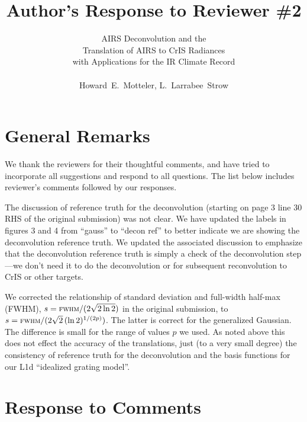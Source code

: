 \documentclass[11pt]{article}
\begin{document}
\title{Author's Response to Reviewer \#2 }

\author{AIRS Deconvolution and the \\
       Translation of AIRS to CrIS Radiances \\ 
       with Applications for the IR Climate Record \\
       \\
       Howard~E.~Motteler, L.~Larrabee~Strow}

\maketitle

\section{General Remarks}

We thank the reviewers for their thoughtful comments, and have tried
to incorporate all suggestions and respond to all questions.  The list
below includes reviewer's comments followed by our responses.

The discussion of reference truth for the deconvolution (starting on
page 3 line 30 RHS of the original submission) was not clear.  We
have updated the labels in figures 3 and 4 from ``gauss'' to ``decon
ref'' to better indicate we are showing the deconvolution reference
truth.  We updated the associated discussion to emphasize that the
deconvolution reference truth is simply a check of the deconvolution
step---we don't need it to do the deconvolution or for subsequent
reconvolution to CrIS or other targets.

We corrected the relationship of standard deviation and full-width
half-max (FWHM), $s=\mbox{\small\textsc{fwhm}} / (2\sqrt{2\ln 2})$ in the original
submission, to $s=\mbox{\small\textsc{fwhm}} / (2\sqrt{2}\,(\ln 2)^{1/(2p)})$.  The
latter is correct for the generalized Gaussian.  The difference is
small for the range of values $p$ we used.  As noted above this does
not effect the accuracy of the translations, just (to a very small
degree) the consistency of reference truth for the deconvolution and
the basis functions for our L1d ``idealized grating model''.

\section{Response to Comments}
\end{document}
